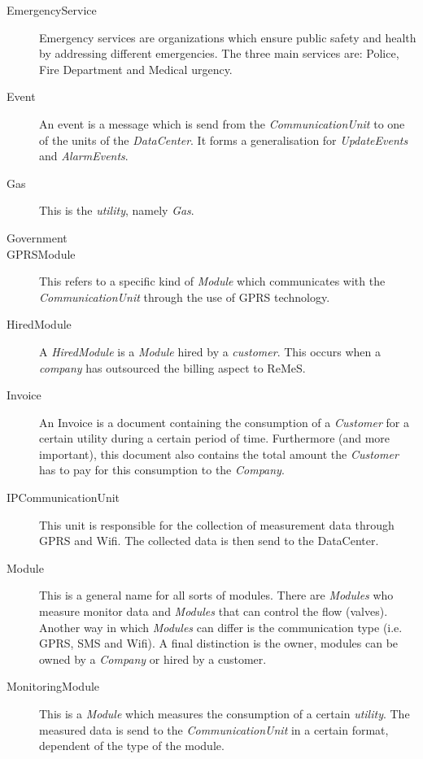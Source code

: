 \begin{description}
\item[EmergencyService] Emergency services are organizations which ensure public
safety and health by addressing different emergencies. The three main services
are: Police, Fire Department and Medical urgency.

\item[Event] An event is a message which is send from the
\emph{CommunicationUnit} to one of the units of the \emph{DataCenter}. It forms
a generalisation for \emph{UpdateEvents} and \emph{AlarmEvents}.

\item[Gas] This is the \emph{utility}, namely \emph{Gas}.

\item[Government] 

\item[GPRSModule] This refers to a specific kind of \emph{Module} which
communicates with the \emph{CommunicationUnit} through the use of GPRS
technology.

\item[HiredModule] A \emph{HiredModule} is a \emph{Module} hired by a
\emph{customer}. This occurs when a \emph{company} has outsourced the billing
aspect to ReMeS.

\item[Invoice] An Invoice is a document containing the consumption of a
\emph{Customer} for a certain utility during a certain period of time.
Furthermore (and more important), this document also contains the total amount
the \emph{Customer} has to pay for this consumption to the \emph{Company}.

\item[IPCommunicationUnit] This unit is responsible for the collection of
measurement data through GPRS and Wifi. The collected data is then send to the
DataCenter.

\item[Module] This is a general name for all sorts of modules.
There are \emph{Modules} who measure monitor data and \emph{Modules} that can
control the flow (valves). Another way in which \emph{Modules} can differ is the
communication type (i.e. GPRS, SMS and Wifi). A final distinction is the owner,
modules can be owned by a \emph{Company} or hired by a customer.

\item[MonitoringModule] This is a \emph{Module} which measures the consumption
of a certain \emph{utility}. The measured data is send to the
\emph{CommunicationUnit} in a certain format, dependent of the type of the
module.


\end{description}
